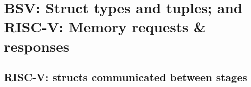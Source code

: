 

\chapter{BSV: Struct types and tuples; and\\
RISC-V: Memory requests \& responses}


\setcounter{page}{1}
\renewcommand{\thepage}{\arabic{chapter}-\arabic{page}}

\label{ch_Structs_Mem_Reqs_Rsps}


\section{RISC-V: structs communicated between stages}


